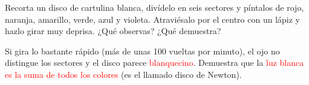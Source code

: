 \begin{exercise}
    Recorta un disco de cartulina blanca, divídelo en seis sectores y píntalos de rojo, naranja, amarillo, verde, azul y violeta. Atraviésalo por el centro con un lápiz y hazlo girar muy deprisa. ¿Qué observas? ¿Qué demuestra?
    \begin{solu}
        Si gira lo bastante rápido (más de unas 100 vueltas por minuto), el ojo no distingue los sectores y el disco parece \textcolor{red}{blanquecino}. Demuestra que la \textcolor{red}{luz blanca es la suma de todos los colores} (es el llamado disco de Newton).
    \end{solu}
\end{exercise}

